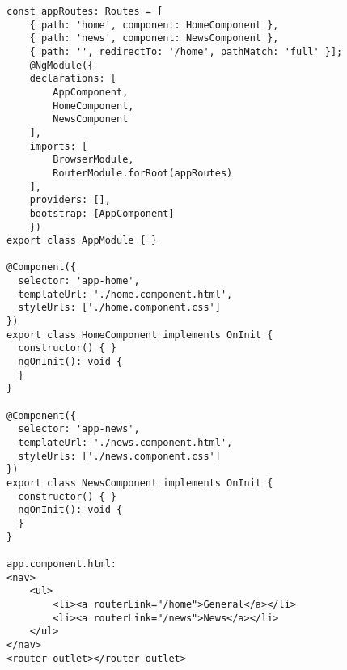 \documentclass{article}
\begin{document}
\begin{lstlisting}[frame=single, basicstyle=\ttfamily, breaklines=true, breakatwhitespace=true, postbreak=\mbox{\textcolor{red}{$\hookrightarrow$}\space}]
const appRoutes: Routes = [
    { path: 'home', component: HomeComponent },
    { path: 'news', component: NewsComponent },
    { path: '', redirectTo: '/home', pathMatch: 'full' }];
    @NgModule({
    declarations: [
        AppComponent,
        HomeComponent,
        NewsComponent
    ],
    imports: [
        BrowserModule,
        RouterModule.forRoot(appRoutes)
    ],
    providers: [],
    bootstrap: [AppComponent]
    })
export class AppModule { }

@Component({
  selector: 'app-home',
  templateUrl: './home.component.html',
  styleUrls: ['./home.component.css']
})
export class HomeComponent implements OnInit {
  constructor() { }
  ngOnInit(): void {
  }
}

@Component({
  selector: 'app-news',
  templateUrl: './news.component.html',
  styleUrls: ['./news.component.css']
})
export class NewsComponent implements OnInit {
  constructor() { }
  ngOnInit(): void {
  }
}

app.component.html:    
<nav>
    <ul>
        <li><a routerLink="/home">General</a></li>
        <li><a routerLink="/news">News</a></li>
    </ul>
</nav>
<router-outlet></router-outlet>
\end{lstlisting}
\end{document}
